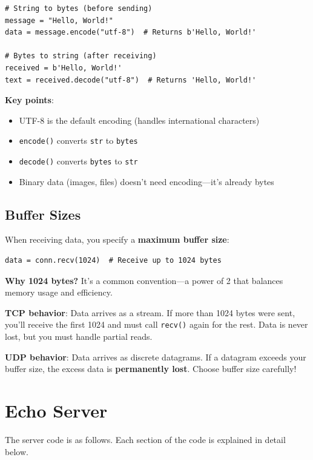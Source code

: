 \documentclass[]{article}
\begin{document}
  \begin{verbatim}
# String to bytes (before sending)
message = "Hello, World!"
data = message.encode("utf-8")  # Returns b'Hello, World!'

# Bytes to string (after receiving)
received = b'Hello, World!'
text = received.decode("utf-8")  # Returns 'Hello, World!'
  \end{verbatim}

  \textbf{Key points}:
  \begin{itemize}
    \item UTF-8 is the default encoding (handles international characters)
    \item \texttt{encode()} converts \texttt{str} to \texttt{bytes}
    \item \texttt{decode()} converts \texttt{bytes} to \texttt{str}
    \item Binary data (images, files) doesn't need encoding---it's already bytes
  \end{itemize}

  \subsection{Buffer Sizes}
  When receiving data, you specify a \textbf{maximum buffer size}:

  \begin{verbatim}
data = conn.recv(1024)  # Receive up to 1024 bytes
  \end{verbatim}

  \textbf{Why 1024 bytes?} It's a common convention---a power of 2 that balances memory usage and efficiency.

  \textbf{TCP behavior}: Data arrives as a stream. If more than 1024 bytes were sent, you'll receive the first 1024 and must call \texttt{recv()} again for the rest. Data is never lost, but you must handle partial reads.

  \textbf{UDP behavior}: Data arrives as discrete datagrams. If a datagram exceeds your buffer size, the excess data is \textbf{permanently lost}. Choose buffer size carefully!

  \section{Echo Server}

  The server code is as follows. Each section of the code is explained in detail below.
\end{document}
